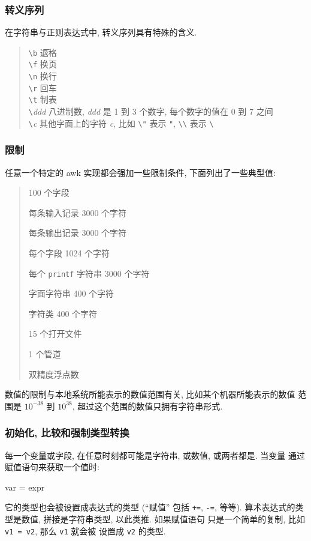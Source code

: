 \subsubsection{转义序列}
在字符串与正则表达式中, 转义序列具有特殊的含义.
\begin{quote}
    \begin{tabbing}
        \verb'\b' \hspace{4em} \= 退格 \\
        \verb'\f' \> 换页 \\
        \verb'\n' \> 换行 \\
        \verb'\r' \> 回车 \\
        \verb'\t' \> 制表 \\
        \verb'\'\textit{ddd} \> 八进制数, \textit{ddd} 是 1 到 3 个数字,
        每个数字的值在 0 到 7 之间 \\
        \verb'\'\textit{c} \> 其他字面上的字符 \textit{c}, 比如 \verb'\"'
        表示 \verb'"', \verb'\\' 表示 \verb'\' \\
    \end{tabbing}
\end{quote}

\subsubsection{限制}
任意一个特定的 awk 实现都会强加一些限制条件, 下面列出了一些典型值:
\begin{quote}
    100 个字段 \par
    每条输入记录 3000 个字符 \par
    每条输出记录 3000 个字符 \par
    每个字段 1024 个字符 \par
    每个 \texttt{printf} 字符串 3000 个字符 \par
    字面字符串 400 个字符 \par
    字符类 400 个字符 \par
    15 个打开文件 \par
    1 个管道 \par
    双精度浮点数
\end{quote}
数值的限制与本地系统所能表示的数值范围有关, 比如某个机器所能表示的数值 
范围是 $10^{-38}$ 到  $10^{38}$, 超过这个范围的数值只拥有字符串形式.
\subsubsection{初始化, 比较和强制类型转换}
每一个变量或字段, 在任意时刻都可能是字符串, 或数值, 或两者都是. 当变量
通过赋值语句来获取一个值时:
\begin{awkcode}
    var = expr
\end{awkcode}
它的类型也会被设置成表达式的类型 (``赋值'' 包括 \texttt{+=}, \texttt{-=},
等等). 算术表达式的类型是数值, 拼接是字符串类型, 以此类推. 如果赋值语句
只是一个简单的复制, 比如 \texttt{v1 = v2}, 那么 \texttt{v1} 就会被
设置成 \texttt{v2} 的类型.

